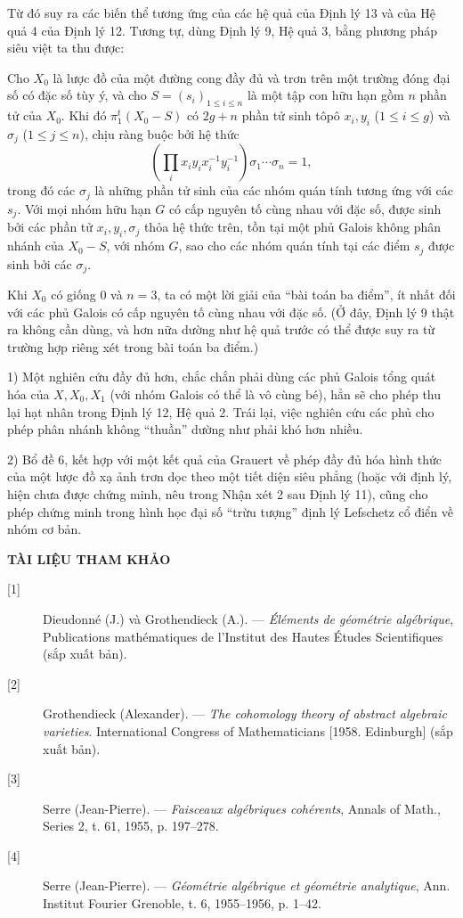 Từ đó suy ra các biến thể tương ứng của các hệ quả của Định lý 13 và của Hệ
quả 4 của Định lý 12. Tương tự, dùng Định lý 9, Hệ quả 3, bằng phương pháp
siêu việt ta thu được:

 Cho $X_0$ là lược đồ của một đường cong đầy đủ và trơn trên
một trường đóng đại số có đặc số tùy ý, và cho
$S=(s_i)_{1\le i\le n}$ là một tập con hữu hạn gồm $n$ phần tử của $X_0$. Khi
đó $\pi_1^t(X_0-S)$ có $2g+n$ phần tử sinh tôpô
$x_i,y_i$ ($1\le i\le g$) và $\sigma_j$ ($1\le j\le n$), chịu ràng buộc bởi
hệ thức
\[
  \left(\prod_i x_i y_i x_i^{-1}y_i^{-1}\right)
  \sigma_1\cdots\sigma_n=1,
\]
trong đó các $\sigma_j$ là những phần tử sinh của các nhóm quán tính tương ứng
với các $s_j$. Với mọi nhóm hữu hạn $G$ có cấp nguyên tố cùng nhau với đặc số,
được sinh bởi các phần tử $x_i,y_i,\sigma_j$ thỏa hệ thức trên, tồn tại một
phủ Galois không phân nhánh của $X_0-S$, với nhóm $G$, sao cho các nhóm quán
tính tại các điểm $s_j$ được sinh bởi các $\sigma_j$.

Khi $X_0$ có giống 0 và $n=3$, ta có một lời giải của “bài toán ba điểm”, ít
nhất đối với các phủ Galois có cấp nguyên tố cùng nhau với đặc số. (Ở đây,
Định lý 9 thật ra không cần dùng, và hơn nữa dường như hệ quả trước có thể được
suy ra từ trường hợp riêng xét trong bài toán ba điểm.)


1) Một nghiên cứu đầy đủ hơn, chắc chắn phải dùng các phủ Galois tổng quát hóa
của $X,X_0,X_1$ (với nhóm Galois có thể là vô cùng bé), hẳn sẽ cho phép thu
lại hạt nhân trong Định lý 12, Hệ quả 2. Trái lại, việc nghiên cứu các phủ cho
phép phân nhánh không “thuần” dường như phải khó hơn nhiều.

2) Bổ đề 6, kết hợp với một kết quả của Grauert về phép đầy đủ hóa hình thức
của một lược đồ xạ ảnh trơn dọc theo một tiết diện siêu phẳng (hoặc với định
lý, hiện chưa được chứng minh, nêu trong Nhận xét 2 sau Định lý 11), cũng cho
phép chứng minh trong hình học đại số “trừu tượng” định lý Lefschetz cổ điển về
nhóm cơ bản.

\begin{center}
  \textbf{TÀI LIỆU THAM KHẢO}
\end{center}

\begin{description}
  \item[{[1]}] Dieudonné (J.) và Grothendieck (A.). --- \emph{Éléments de
    géométrie algébrique}, Publications mathématiques de l'Institut des Hautes
    Études Scientifiques (sắp xuất bản).
  \item[{[2]}] Grothendieck (Alexander). --- \emph{The cohomology theory of
    abstract algebraic varieties}. International Congress of Mathematicians
    [1958. Edinburgh] (sắp xuất bản).
  \item[{[3]}] Serre (Jean-Pierre). --- \emph{Faisceaux algébriques
    cohérents}, Annals of Math., Series 2, t. 61, 1955, p. 197--278.
  \item[{[4]}] Serre (Jean-Pierre). --- \emph{Géométrie algébrique et
    géométrie analytique}, Ann. Institut Fourier Grenoble, t. 6, 1955--1956,
    p. 1--42.
\end{description}

\par

